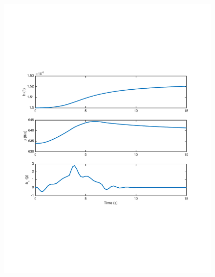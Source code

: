 \documentclass[12pt]{article}
\begin{document}
\begin{figure}[h]
\begin{center}
\includegraphics[width=1\textwidth]{figures/output x}
\end{center}
\end{figure}
\end{document}
